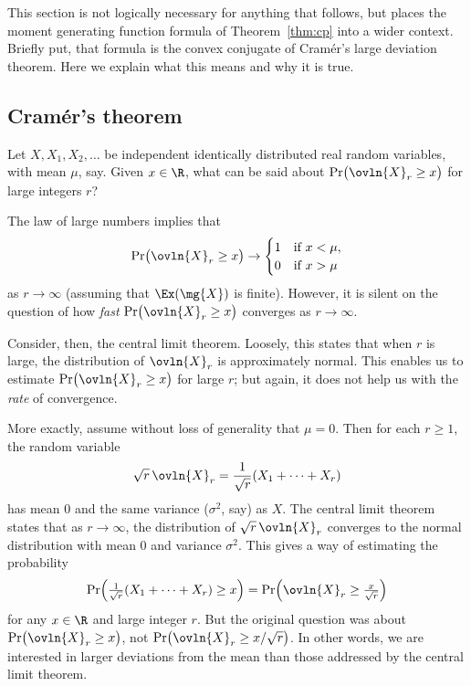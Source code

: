This section is not logically necessary for anything that follows, but
places the moment generating function formula of Theorem~\ref{thm:cp} into
a wider context.  Briefly put, that formula is the convex conjugate of
Cram\'er's large deviation theorem.  Here we explain what this means and
why it is true. 


\subsection*{Cram\'er's theorem}

Let $X, X_1, X_2, \ldots$ be independent identically distributed real
random variables, with mean $\mu$, say.  Given $x \in \R$, what can be said
about $\Pr\bigl(\ovln{X}_r \geq x\bigr)$ for large integers $r$?

The law%
%
% 
of large numbers implies that
\[
\Pr\bigl(\ovln{X}_r \geq x\bigr)
\to
\begin{cases}
1       &\text{if } x < \mu,    \\
0       &\text{if } x > \mu
\end{cases}
\]
as $r \to \infty$ (assuming that $\Ex(\mg{X})$ is finite).  However, it is
silent on the question of how \emph{fast} $\Pr\bigl(\ovln{X}_r \geq
x\bigr)$ converges as $r \to \infty$.

Consider, then, the central%
%
% 
limit theorem.  Loosely, this states that when $r$ is large, the
distribution of $\ovln{X}_r$ is approximately normal.%
%
% 
This enables us to
estimate $\Pr\bigl(\ovln{X}_r \geq x\bigr)$ for large $r$; but again, it
does not help us with the \emph{rate} of convergence.

More exactly, assume without loss of generality that $\mu = 0$.  Then for
each $r \geq 1$, the random variable
\[
\sqrt{r}\,\ovln{X}_r
=
\frac{1}{\sqrt{r}}(X_1 + \cdots + X_r)
\]
has mean $0$ and the same variance ($\sigma^2$, say) as $X$.  The central
limit theorem states that as $r \to \infty$, the distribution of
$\sqrt{r}\,\ovln{X}_r$ converges to the normal distribution with mean $0$
and variance $\sigma^2$.  This gives a way of estimating the probability
\[
\Pr\Bigl(
\tfrac{1}{\sqrt{r}} (X_1 + \cdots + X_r) \geq x
\Bigr)
=
\Pr\Bigl( \ovln{X}_r \geq \tfrac{x}{\sqrt{r}} \Bigr)
\]
for any $x \in \R$ and large integer $r$.  But the original question was
about $\Pr\bigl(\ovln{X}_r \geq x\bigr)$, not $\Pr\bigl(\ovln{X}_r \geq
x/\sqrt{r}\bigr)$.  In other words, we are interested in larger deviations
from the mean than those addressed by the central limit theorem.

